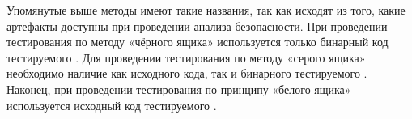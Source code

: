 %
Упомянутые выше методы имеют такие названия, так как исходят из того, какие артефакты  доступны при проведении анализа безопасности. 
%
При проведении тестирования  по методу «чёрного ящика» используется только бинарный код тестируемого . 
%
Для проведении тестирования  по методу «серого ящика» необходимо наличие как исходного кода, так и бинарного тестируемого . 
%
Наконец, при проведении тестирования  по принципу «белого ящика» используется исходный код тестируемого .